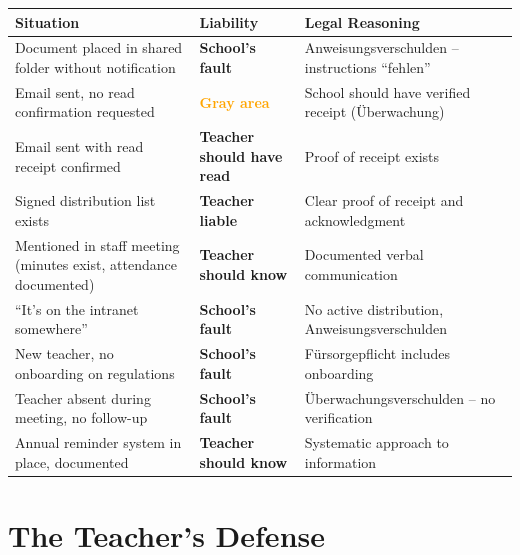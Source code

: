 \documentclass[11pt,a4paper]{article}
\begin{document}
\begin{center}
\begin{longtable}{p{6cm}p{3cm}p{4.5cm}}
\toprule
\textbf{Situation} & \textbf{Liability} & \textbf{Legal Reasoning} \\
\midrule
\endhead

Document placed in shared folder without notification &
\textcolor{warningred}{\textbf{School's fault}} &
Anweisungsverschulden -- instructions ``fehlen'' \\[0.5em]

Email sent, no read confirmation requested &
\textcolor{orange}{\textbf{Gray area}} &
School should have verified receipt (Überwachung) \\[0.5em]

Email sent with read receipt confirmed &
\textcolor{successgreen}{\textbf{Teacher should have read}} &
Proof of receipt exists \\[0.5em]

Signed distribution list exists &
\textcolor{successgreen}{\textbf{Teacher liable}} &
Clear proof of receipt and acknowledgment \\[0.5em]

Mentioned in staff meeting (minutes exist, attendance documented) &
\textcolor{successgreen}{\textbf{Teacher should know}} &
Documented verbal communication \\[0.5em]

``It's on the intranet somewhere'' &
\textcolor{warningred}{\textbf{School's fault}} &
No active distribution, Anweisungsverschulden \\[0.5em]

New teacher, no onboarding on regulations &
\textcolor{warningred}{\textbf{School's fault}} &
Fürsorgepflicht includes onboarding \\[0.5em]

Teacher absent during meeting, no follow-up &
\textcolor{warningred}{\textbf{School's fault}} &
Überwachungsverschulden -- no verification \\[0.5em]

Annual reminder system in place, documented &
\textcolor{successgreen}{\textbf{Teacher should know}} &
Systematic approach to information \\

\bottomrule
\end{longtable}
\end{center}

\section{The Teacher's Defense}
\end{document}
